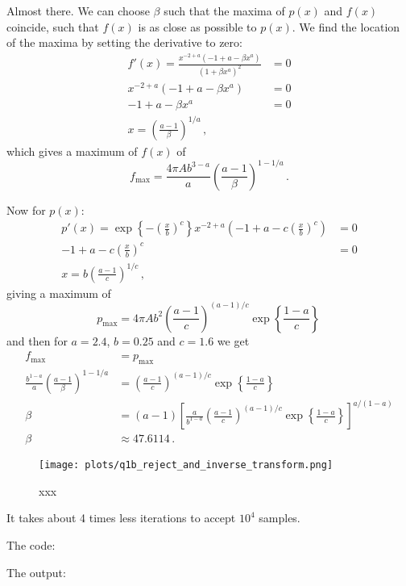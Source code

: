 Almost there. We can choose $\beta$ such that the maxima of $p(x)$ and $f(x)$ coincide, such that $f(x)$ is as close as possible to $p(x)$. We find the location of the maxima by setting the derivative to zero:
\begin{align}
    f'(x) = \frac{x^{-2 + a} (-1 + a - \beta x^a)}{(1 + \beta x^a)^2} &= 0 \\
    x^{-2 + a} (-1 + a - \beta x^a) &= 0 \\
    -1 + a - \beta x^a &= 0 \\
    x = \left( \frac{a-1}{\beta} \right)^{1/a} \, ,
\end{align}
which gives a maximum of $f(x)$ of 
\begin{equation}
    f_{\mathrm{max}} = \frac{4\pi A b^{3-a}}{a} \left( \frac{a-1}{\beta} \right)^{1-1/a} \, .
\end{equation}

Now for $p(x)$:
\begin{align}
    p'(x) = \exp\left\{ -\left(\frac{x}{b}\right)^c\right\} x^{-2 + a} \left(-1 + a - c \left(\frac{x}{b}\right)^c \right) &= 0 \\
    -1 + a - c \left(\frac{x}{b}\right)^c &= 0 \\
    x = b\left(\frac{a - 1}{c}\right)^{1/c} \, ,
\end{align}
giving a maximum of
\begin{equation}
    p_{\mathrm{max}} = 4\pi A b^{2} \left(\frac{a - 1}{c}\right)^{(a-1)/c} \exp\left\{\frac{1-a}{c} \right\} \,
\end{equation}
and then for $a=2.4$, $b=0.25$ and $c=1.6$ we get
\begin{align}
    f_{\mathrm{max}} &= p_{\mathrm{max}} \\
    \frac{b^{1-a}}{a} \left( \frac{a-1}{\beta} \right)^{1-1/a} &= \left(\frac{a - 1}{c}\right)^{(a-1)/c} \exp\left\{\frac{1-a}{c} \right\} \\
    \beta &= (a-1)\left[ \frac{a}{b^{1-a}} \left(\frac{a - 1}{c}\right)^{(a-1)/c} \exp\left\{\frac{1-a}{c} \right\} \right]^{a/(1-a)} \\
    \beta &\approx 47.6114 \, .
\end{align}

\begin{figure}[H]
    \centering
    \texttt{[image: plots/q1b\_reject\_and\_inverse\_transform.png]}
    \caption{xxx
    } \label{fig:1b_extra}
\end{figure}

It takes about 4 times less iterations to accept $10^4$ samples.

\noindent The code:



\noindent The output:


